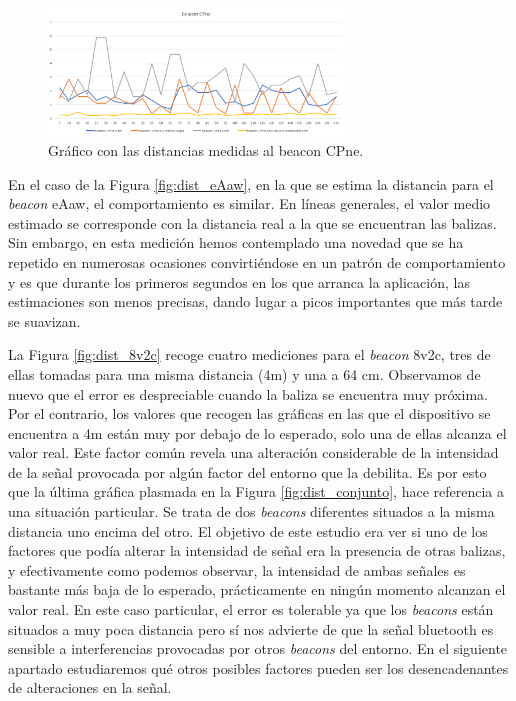 \begin{figure}[t]
	\centering
	\includegraphics[width=0.7\textwidth]{Imagenes/Descripciondeltrabajo/dist_CPne}
	\caption{Gráfico con las distancias medidas al beacon CPne. }
	\label{fig:dist_CPne}
\end{figure}

En el caso de la Figura \ref{fig:dist_eAaw}, en la que se estima la distancia para el \textit{beacon} eAaw, el comportamiento es similar. En líneas generales, el valor medio estimado se corresponde con la distancia real a la que se encuentran las balizas. Sin embargo, en esta medición hemos contemplado una novedad que se ha repetido en numerosas ocasiones convirtiéndose en un patrón de comportamiento y es que durante los primeros segundos en los que arranca la aplicación, las estimaciones son menos precisas, dando lugar a picos importantes que más tarde se suavizan. 

La Figura \ref{fig:dist_8v2c} recoge cuatro mediciones para el \textit{beacon} 8v2c, tres de ellas tomadas para una misma distancia (4m) y una a 64 cm. Observamos de nuevo que el error es despreciable cuando la baliza se encuentra muy próxima. Por el contrario, los valores que recogen las gráficas en las que el dispositivo se encuentra a 4m están muy por debajo de lo esperado, solo una de ellas alcanza el valor real. Este factor común revela una alteración considerable de la intensidad de la señal provocada por algún factor del entorno que la debilita. Es por esto que la última gráfica plasmada en la Figura \ref{fig:dist_conjunto}, hace referencia a una situación particular. Se trata de dos \textit{beacons} diferentes situados a la misma distancia uno encima del otro. El objetivo de este estudio era ver si uno de los factores que podía alterar la intensidad de señal era la presencia de otras balizas, y efectivamente como podemos observar, la intensidad de ambas señales es bastante más baja de lo esperado, prácticamente en ningún momento alcanzan el valor real. En este caso particular, el error es tolerable ya que los \textit{beacons} están situados a muy poca distancia pero sí nos advierte de que la señal bluetooth es sensible a interferencias provocadas por otros \textit{beacons} del entorno. En el siguiente apartado estudiaremos qué otros posibles factores pueden ser los desencadenantes de alteraciones en la señal. 

